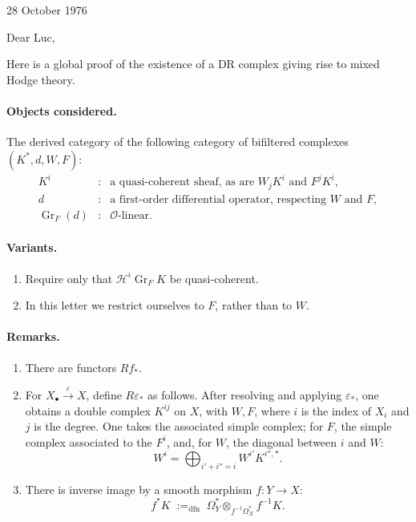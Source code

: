 \documentclass[11pt]{article}
\newcommand{\DR}{\mathrm{DR}}
\newcommand{\Gr}{\operatorname{Gr}}
\newcommand{\HH}{\mathcal H}
\begin{document}
\begin{flushright}
28 October 1976
\end{flushright}

Dear Luc,

Here is a global proof of the existence of a \(\DR\) complex giving rise to mixed Hodge theory.

\paragraph{Objects considered.}
The derived category of the following category of bifiltered complexes \((K^\ast,d,W,F)\):
\[
\begin{array}{rcl}
K^i &:& \text{a quasi-coherent sheaf, as are } W_jK^i \text{ and } F^jK^i,\\
d &:& \text{a first-order differential operator, respecting } W \text{ and } F,\\
\Gr_F(d) &:& \mathcal O\text{-linear.}
\end{array}
\]

\paragraph{Variants.}
\begin{enumerate}[label=\alph*)]
\item Require only that \(\HH^i\Gr_FK\) be quasi-coherent.
\item In this letter we restrict ourselves to \(F\), rather than to \(W\).
\end{enumerate}

\paragraph{Remarks.}
\begin{enumerate}[label=\alph*)]
\item There are functors \(Rf_\ast\).

\item For \(X_\bullet \xrightarrow{\varepsilon} X\), define \(R\varepsilon_\ast\) as follows. After resolving and applying \(\varepsilon_\ast\), one obtains a double complex \(K^{ij}\) on \(X\), with \(W,F\), where \(i\) is the index of \(X_i\) and \(j\) is the degree. One takes the associated simple complex; for \(F\), the simple complex associated to the \(F^i\), and, for \(W\), the diagonal between \(i\) and \(W\):
\[
  W^i=\bigoplus_{i'+i''=i} W^{i'}K^{i'',\ast}.
\]

\item There is inverse image by a smooth morphism \(f:Y\to X\):
\[
  f^\ast K\; {:=}_{\mathrm{dfn}}\; \Omega_Y^\ast\otimes_{f^{-1}\Omega_X^\ast} f^{-1}K.
\]
\end{enumerate}
\end{document}
